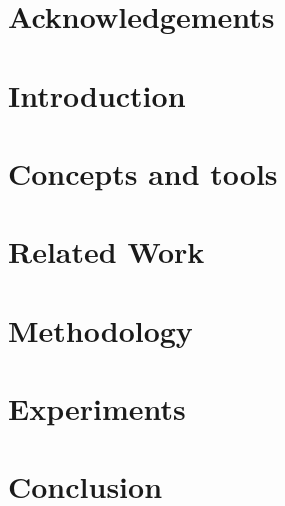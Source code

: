 \documentclass[11pt]{book}
\begin{document}

\doublespacing



\chapter*{Acknowledgements}



\tableofcontents{}
\printacronyms[name=List of Abbreviations, heading=chapter*]
\listoffigures
{}
\listoftables
{}
\clearpage


% 

\chapter {Introduction}


\chapter {Concepts and tools}
\label{concepts}


\chapter {Related Work}
\label{literature}



\chapter{Methodology}
\label{sec:exp}


\chapter {Experiments}
\label{chapter:four}


\chapter{Conclusion}
\label{conclusion}


\renewcommand{\bibname}{References}
	

\end{document}
